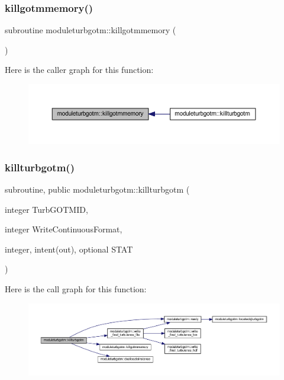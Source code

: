 \subsubsection{\texorpdfstring{killgotmmemory()}{killgotmmemory()}}
{\footnotesize\ttfamily subroutine moduleturbgotm\+::killgotmmemory (\begin{DoxyParamCaption}{ }\end{DoxyParamCaption})\hspace{0.3cm}{\ttfamily [private]}}

Here is the caller graph for this function\+:\nopagebreak
\begin{figure}[H]
\begin{center}
\leavevmode
\includegraphics[width=350pt]{namespacemoduleturbgotm_aad945eb0d5a2d67bc28f53a95bed4242_icgraph}
\end{center}
\end{figure}
\mbox{\label{namespacemoduleturbgotm_a59463567a7797fc2bb742f83929626b1}} 
\subsubsection{\texorpdfstring{killturbgotm()}{killturbgotm()}}
{\footnotesize\ttfamily subroutine, public moduleturbgotm\+::killturbgotm (\begin{DoxyParamCaption}\item[{integer}]{Turb\+G\+O\+T\+M\+ID,  }\item[{integer}]{Write\+Continuous\+Format,  }\item[{integer, intent(out), optional}]{S\+T\+AT }\end{DoxyParamCaption})}

Here is the call graph for this function\+:\nopagebreak
\begin{figure}[H]
\begin{center}
\leavevmode
\includegraphics[width=350pt]{namespacemoduleturbgotm_a59463567a7797fc2bb742f83929626b1_cgraph}
\end{center}
\end{figure}
\mbox{\label{namespacemoduleturbgotm_a2445ccc2c59cf2ae892fd78dda123a3d}} 
